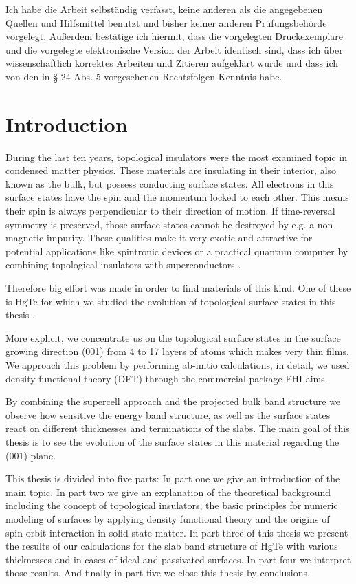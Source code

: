 \documentclass[english, a4, 12pt]{scrartcl}
\begin{document}
\thispagestyle{empty}
Ich habe die Arbeit selbständig verfasst, keine anderen als die angegebenen Quellen und Hilfsmittel benutzt und bisher keiner anderen Prüfungsbehörde vorgelegt. Außerdem bestätige ich hiermit, dass die vorgelegten Druckexemplare und die vorgelegte elektronische Version der Arbeit identisch sind, dass ich über wissenschaftlich korrektes Arbeiten und Zitieren aufgeklärt wurde und dass ich von den in § 24 Abs. 5 vorgesehenen Rechtsfolgen Kenntnis habe. 
\newpage
\thispagestyle{empty}
\tableofcontents	
\clearpage	
\setcounter{page}{1}
\section{Introduction}
	During the last ten years, topological insulators were the most examined topic in condensed matter physics. These materials are insulating in their interior, also known as the bulk, but possess conducting surface states.
	All electrons in this surface states have the spin and the momentum locked to each other. This means their spin is always perpendicular to their direction of motion. If time-reversal symmetry is preserved, those surface states cannot be destroyed by e.g. a non-magnetic impurity. 
	These qualities make it very exotic and attractive for potential applications like spintronic devices or a practical quantum computer by combining topological insulators with superconductors \cite{applications}.
	
	Therefore big effort was made in order to find materials of this kind. One of these is HgTe for which we studied the evolution of topological surface states in this thesis \cite{top_surf_states}. 
	
	More explicit, we concentrate us on the topological surface states in the surface growing direction (001) from 4 to 17 layers of atoms which makes very thin films. We approach this problem by performing ab-initio calculations, in detail, we used density functional theory (DFT) through the commercial package FHI-aims. 
	
	By combining the supercell approach and the projected bulk band structure we observe how sensitive the energy band structure, as well as the surface states react on different thicknesses and terminations of the slabs. 
	The main goal of this thesis is to see the evolution of the surface states in this material regarding the (001) plane. 
	
	This thesis is divided into five parts: In part one we give an introduction of the main topic. In part two we give an explanation of the theoretical background including the concept of topological insulators, the basic principles for numeric modeling of surfaces by applying density functional theory and the origins of spin-orbit interaction in solid state matter.
	In part three of this thesis we present the results of our calculations for the slab band structure of HgTe with various thicknesses and in cases of ideal and passivated surfaces.
	In part four we interpret those results. And finally in part five we close this thesis by conclusions. 
		
\end{document}
